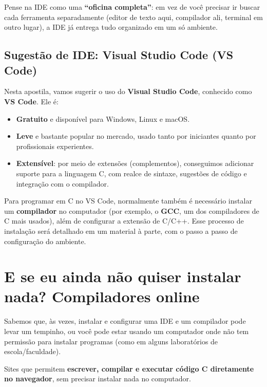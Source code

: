 Pense na IDE como uma \textbf{``oficina completa''}: em vez de você precisar ir buscar cada ferramenta separadamente (editor de texto aqui, compilador ali, terminal em outro lugar), a IDE já entrega tudo organizado em um só ambiente.

\subsection*{\textcolor{verdeC}{Sugestão de IDE: Visual Studio Code (VS Code)}}

Nesta apostila, vamos sugerir o uso do \textbf{Visual Studio Code}, conhecido como \textbf{VS Code}. Ele é:

\begin{itemize}
    \item \textcolor{verdeC}{\faCheckCircle} \textbf{Gratuito} e disponível para Windows, Linux e macOS.
    \item \textcolor{verdeC}{\faCheckCircle} \textbf{Leve} e bastante popular no mercado, usado tanto por iniciantes quanto por profissionais experientes.
    \item \textcolor{verdeC}{\faCheckCircle} \textbf{Extensível}: por meio de extensões (complementos), conseguimos adicionar suporte para a linguagem C, com realce de sintaxe, sugestões de código e integração com o compilador.
\end{itemize}

Para programar em C no VS Code, normalmente também é necessário instalar um \textbf{compilador} no computador (por exemplo, o \textbf{GCC}, um dos compiladores de C mais usados), além de configurar a extensão de C/C++. Esse processo de instalação será detalhado em um material à parte, com o passo a passo de configuração do ambiente.

\section{\textcolor{azulPrincipal}{E se eu ainda não quiser instalar nada? Compiladores online}}

Sabemos que, às vezes, instalar e configurar uma IDE e um compilador pode levar um tempinho, ou você pode estar usando um computador onde não tem permissão para instalar programas (como em alguns laboratórios de escola/faculdade).

\begin{dica}
Sites que permitem \textbf{escrever, compilar e executar código C diretamente no navegador}, sem precisar instalar nada no computador.
\end{dica}

